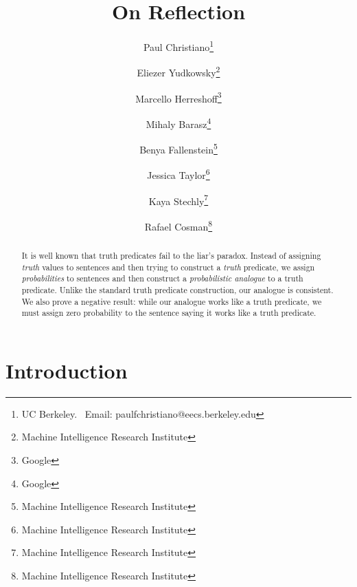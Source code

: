\documentclass[12pt]{article}
\theoremstyle{plain}
\theoremstyle{definition}
\theoremstyle{remark}
\begin{document}
\title{On Reflection \\ }
\author{
Paul Christiano\thanks{UC Berkeley. \ Email: paulfchristiano@eecs.berkeley.edu}
\and
Eliezer Yudkowsky\thanks{Machine Intelligence Research Institute}
\and
Marcello Herreshoff\thanks{Google}
\and
Mihaly Barasz\thanks{Google}
\and 
Benya Fallenstein\thanks{Machine Intelligence Research Institute}
\and
Jessica Taylor\thanks{Machine Intelligence Research Institute}
\and 
Kaya Stechly\thanks{Machine Intelligence Research Institute}
\and
Rafael Cosman\thanks{Machine Intelligence Research Institute}
}
\maketitle
\begin{abstract}
It is well known that truth predicates fail to the liar's paradox.
Instead of assigning \emph{truth} values to sentences and then trying to construct a \emph{truth} predicate, we assign \emph{probabilities} to sentences and then construct a \emph{probabilistic analogue} to a truth predicate. 
Unlike the standard truth predicate construction, our analogue is consistent. 
We also prove a negative result: while our analogue works like a truth predicate, we must assign zero probability to the sentence saying it works like a truth predicate.
\end{abstract}
\setcounter{section}{-1}
\section{Introduction}





\end{document}
